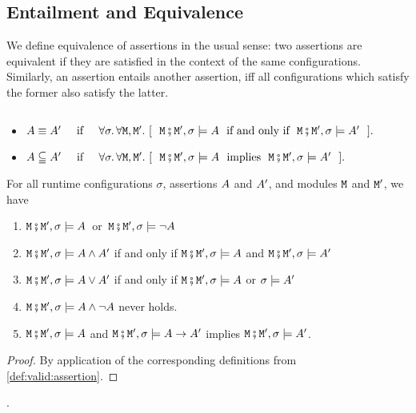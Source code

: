 \subsection{Entailment and Equivalence}
 
We define equivalence of   assertions in the usual sense: two assertions are equivalent if they are satisfied  in
the context of the same configurations.
Similarly, an assertion entails another assertion, iff all configurations 
which satisfy the former also satisfy the latter.  

\begin{definition}
$ ~ $

\begin{itemize}
\item
$\A \equiv \A'\  \IFF\    \forall \sigma.\, \forall \M, \M'. \ [\ \ \M\mkpair \M', \sigma \models \A\ \mbox{ if and only if }\ \M\mkpair \M', \sigma \models \A'\ \ ].$
\item
$\A \subseteqq \A'\  \IFF\    \forall \sigma.\, \forall \M, \M'. \ [\ \ \M\mkpair \M', \sigma \models \A\ \mbox{ implies }\ \M\mkpair \M', \sigma \models \A'\ \ ].$
\end{itemize}
\end{definition}



\begin{lemma}
For all runtime configurations $\sigma$,    assertions $\A$ and $\A'$, and modules $\M$  and $\M'$, we have
\begin{enumerate}
\item
$\M\mkpair \M', \sigma \models \A$\ or\ $\M\mkpair \M', \sigma \models \neg\A$
\item
$\M\mkpair \M', \sigma  \models \A \wedge \A'$ \SP if and only if \SP $\M\mkpair \M', \sigma \models \A$ and $\M\mkpair \M', \sigma  \models \A'$
\item
$\M\mkpair \M', \sigma  \models \A \vee \A'$ \SP if and only if \SP $\M\mkpair \M', \sigma  \models \A$ or  $\sigma \models \A'$
\item
$\M\mkpair \M', \sigma  \models \A \wedge \neg\A$ never holds.
\item
$\M\mkpair \M', \sigma  \models \A$ and  $\M\mkpair \M', \sigma  \models \A \rightarrow \A'$  implies
$\M\mkpair \M', \sigma  \models \A '$.
\end{enumerate}
\end{lemma}
\begin{proof} By application of the corresponding definitions from \ref{def:valid:assertion}.\end{proof}.

